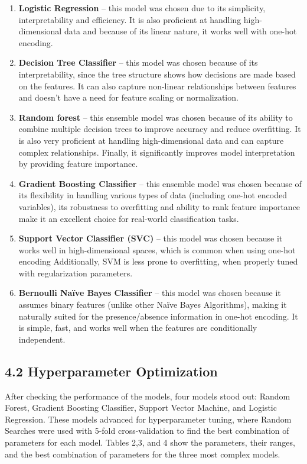 \documentclass[a4paper,oneside,bibliography=totoc]{scrbook}
\begin{document}
\begin{enumerate}
	\item \textbf{Logistic Regression} – this model was chosen due to its simplicity, interpretability and efficiency. It is also proficient at handling high-dimensional data and because of its linear nature, it works well with one-hot encoding. 
	\item \textbf{Decision Tree Classifier} – this model was chosen because of its interpretability, since the tree structure shows how decisions are made based on the features. It can also capture non-linear relationships between features and doesn’t have a need for feature scaling or normalization.
	\item \textbf{Random forest} – this ensemble model was chosen because of its ability to combine multiple decision trees to improve accuracy and reduce overfitting. It is also very proficient at handling high-dimensional data and can capture complex relationships. Finally, it significantly improves model interpretation by providing feature importance.
	\item \textbf{Gradient Boosting Classifier} – this ensemble model was chosen because of its flexibility in handling various types of data (including one-hot encoded variables), its robustness to overfitting and ability to rank feature importance make it an excellent choice for real-world classification tasks.
	\item \textbf{Support Vector Classifier (SVC)} – this model was chosen because it works well in high-dimensional spaces, which is common when using one-hot encoding Additionally, SVM is less prone to overfitting, when properly tuned with regularization parameters.
	\item \textbf{Bernoulli Naïve Bayes Classifier} – this model was chosen because it assumes binary features (unlike other Naïve Bayes Algorithms), making it naturally suited for the presence/absence information in one-hot encoding. It is simple, fast, and works well when the features are conditionally independent.
\end{enumerate}

\subsection*{4.2 Hyperparameter Optimization}
After checking the performance of the models, four models stood out: Random Forest, Gradient Boosting Classifier, Support Vector Machine, and Logistic Regression. These models advanced for hyperparameter tuning, where Random Searches were used with 5-fold cross-validation to find the best combination of parameters for each model. Tables 2,3, and 4 show the parameters, their ranges, and the best combination of parameters for the three most complex models.
\end{document}
